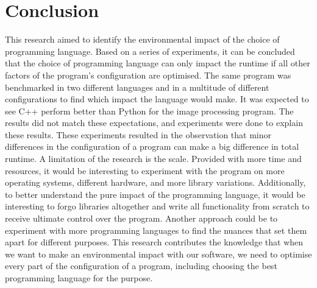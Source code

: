 \chapter{Conclusion}
This research aimed to identify the environmental impact of the choice of programming language. Based on a series of experiments, it can be concluded that the choice of programming language can only impact the runtime if all other factors of the program's configuration are optimised.
The same program was benchmarked in two different languages and in a multitude of different configurations to find which impact the language would make. It was expected to see C++ perform better than Python for the image processing program. The results did not match these expectations, and experiments were done to explain these results. These experiments resulted in the observation that minor differences in the configuration of a program can make a big difference in total runtime.
A limitation of the research is the scale. Provided with more time and resources, it would be interesting to experiment with the program on more operating systems, different hardware, and more library variations. Additionally, to better understand the pure impact of the programming language, it would be interesting to forgo libraries altogether and write all functionality from scratch to receive ultimate control over the program. Another approach could be to experiment with more programming languages to find the nuances that set them apart for different purposes.
This research contributes the knowledge that when we want to make an environmental impact with our software, we need to optimise every part of the configuration of a program, including choosing the best programming language for the purpose.

